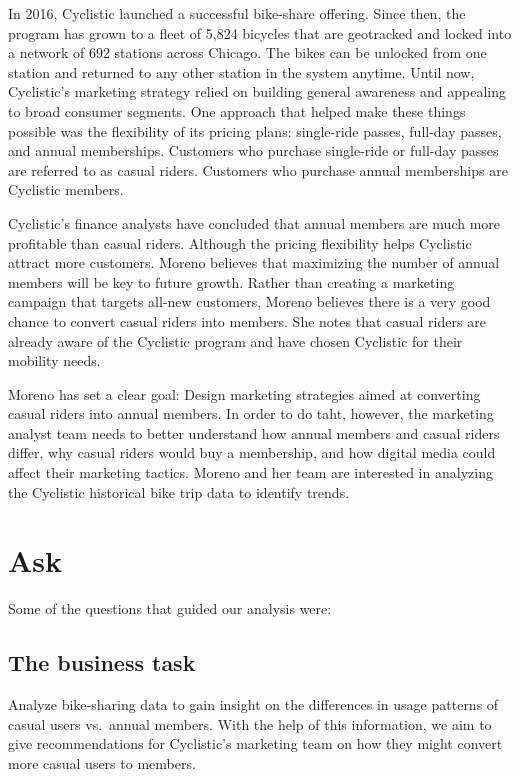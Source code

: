 \documentclass{article}
\begin{document}
In 2016, Cyclistic launched a successful bike-share offering. Since then, the program has grown to a fleet of 5,824 bicycles that are geotracked and locked into a network of 692 stations across Chicago. The bikes can be unlocked from one station and returned to any other station in the system anytime. Until now, Cyclistic's marketing strategy relied on building general awareness and appealing to broad consumer segments. One approach that helped make these things possible was the flexibility of its pricing plans: single-ride passes, full-day passes, and annual memberships. Customers who purchase single-ride or full-day passes are referred to as casual riders. Customers who purchase annual memberships are Cyclistic members.

Cyclistic's finance analysts have concluded that annual members are much more profitable than casual riders. Although the pricing flexibility helps Cyclistic attract more customers. Moreno believes that maximizing the number of annual members will be key to future growth. Rather than creating a marketing campaign that targets all-new customers, Moreno believes there is a very good chance to convert casual riders into members. She notes that casual riders are already aware of the Cyclistic program and have chosen Cyclistic for their mobility needs.

Moreno has set a clear goal: Design marketing strategies aimed at converting casual riders into annual members. In order to do taht, however, the marketing analyst team needs to better understand how annual members and casual riders differ, why casual riders would buy a membership, and how digital media could affect their marketing tactics. Moreno and her team are interested in analyzing the Cyclistic historical bike trip data to identify trends.

\section{Ask}

Some of the questions that guided our analysis were:

\subsection*{The business task}

Analyze bike-sharing data to gain insight on the differences in usage patterns of casual users vs.~annual members. With the help of this information, we aim to give recommendations for Cyclistic's marketing team on how they might convert more casual users to members.
\end{document}
